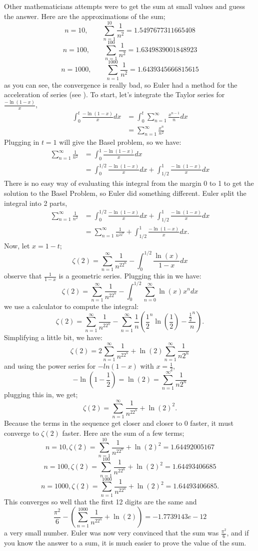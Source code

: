 \documentclass{article}
\theoremstyle{remark}
\theoremstyle{definition}
\begin{document}
Other mathematicians attempts were to get the sum at small values and guess the answer. Here are the approximations of the sum;
\[n=10, \qquad\sum_{n=1}^{10}\frac{1}{n^2}=1.5497677311665408\]
\[n=100, \qquad  \sum_{n=1}^{100}\frac{1}{n^2}=1.6349839001848923\]
\[n=1000,\qquad\sum_{n=1}^{1000}\frac{1}{n^2}=1.6439345666815615\]
as you can see, the convergence is really bad, so Euler had a method for the acceleration of series (see \cite{Gos00}). To start, let's integrate the Taylor series for $\frac{-\ln(1-x)}{x}$,
\begin{align}
\int_{0}^{t}\frac{-\ln(1-x)}{x}dx &=\int_{0}^{t}\sum_{n=1}^{\infty}\frac{x^{n-1}}{n} dx \\
&= \sum_{n=1}^{\infty}\frac{x^{n}}{n^2}
\end{align}
Plugging in $t=1$ will give the Basel problem, so we have:
\begin{align} 
\sum_{n=1}^{\infty}\frac{1}{n^2}&=\int_{0}^{1} \frac{-\ln(1-x)}{x}dx\\
& = \int_{0}^{1/2}\frac{-\ln(1-x)}{x}dx+\int_{1/2}^{1}\frac{-\ln(1-x)}{x}dx
\end{align}
There is no easy way of evaluating this integral from the margin 0 to 1 to get the solution to the Basel Problem, so Euler did something different. Euler split the integral into 2 parts,
\begin{align} 
\sum_{n=1}^{\infty}\frac{1}{n^2}&=\int_{0}^{1/2}\frac{-\ln(1-x)}{x}dx+\int_{1/2}^{1}\frac{-\ln(1-x)}{x}dx\\&= \sum_{n=1}^{\infty}\frac{1}{n^22^n}+\int_{1/2}^{1}\frac{-\ln(1-x)}{x}dx.
\end{align}
Now, let $x=1-t$;
\[\zeta(2)= \sum_{n=1}^{\infty}\frac{1}{n^22^n}-\int_{0}^{1/2}\frac{\ln(x)}{1-x}dx\]
observe that $\frac{1}{1-x}$ is a geometric series. Plugging this in we have:
\[\zeta(2)= \sum_{n=1}^{\infty}\frac{1}{n^22^n}-\int_{0}^{1/2}\sum_{n=0}^{\infty}\ln(x)x^ndx\]
 we use a calculator to compute the integral:
\[\zeta(2)=\sum_{n=1}^{\infty}\frac{1}{n^22^n}-\sum_{n=1}^{\infty}\frac{1}{n}\left(\frac{1}{2}^{n}\ln \left(\frac{1}{2}\right)-\frac{\frac{1}{2}^{n}}{n}\right).\]
Simplifying a little bit, we have:
\[\zeta(2)=2\sum_{n=1}^{\infty}\frac{1}{n^22^n}+\ln(2)\sum_{n=1}^{\infty}\frac{1}{n2^n}\]
and using the power series for $-ln(1-x)$ with $x=\frac{1}{2}$,
\[-\ln(1-\frac{1}{2})=\ln(2)=\sum_{n=1}^{\infty}\frac{1}{n2^n}\]
plugging this in, we get;
\[\zeta(2)=\sum_{n=1}^{\infty}\frac{1}{n^22^n}+\ln(2)^2.\]
Because the terms in the sequence get closer and closer to 0 faster, it must converge to $\zeta(2)$ faster. Here are the sum of a few terms;
\[n=10, \zeta(2)=\sum_{n=1}^{10}\frac{1}{n^22^n}+\ln(2)^2=1.64492005167\]
\[n=100, \zeta(2)=\sum_{n=1}^{100}\frac{1}{n^22^n}+\ln(2)^2=1.64493406685\]
\[n=1000, \zeta(2)=\sum_{n=1}^{1000}\frac{1}{n^22^n}+\ln(2)^2=1.64493406685.\]
This converges so well that the first 12 digits are the same and 
\[\frac{\pi^2}{6}-(\sum_{n=1}^{1000}\frac{1}{n^22^n}+\ln(2))=-1.7739143e-12\]
a very small number. Euler was now very convinced that the sum was $\frac{\pi^2}{6}$, and if you know the answer to a sum, it is much easier to prove the value of the sum. 
\end{document}
